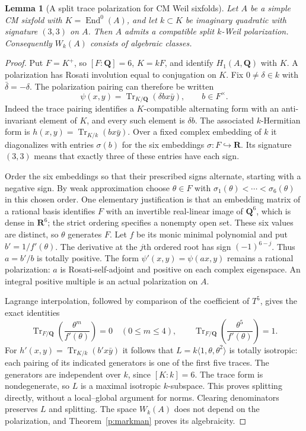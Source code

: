 \documentclass[10pt,reqno]{article}
\theoremstyle{emphasizedplain}
\theoremstyle{emphasizeddefinition}
\theoremstyle{emphasizeddefinition}
\newtheorem{prelemma}{Lemma}
\DeclareMathOperator{\End}{End}
\DeclareMathOperator{\Tr}{Tr}
\newcommand{\Q}{\mathbf Q}
\newcommand{\R}{\mathbf R}
\begin{document}
\begin{prelemma}[A split trace polarization for CM Weil sixfolds]
\label{p:CMsplit}
Let $A$ be a simple CM sixfold with $K=\End^0(A)$, and let
$k\subset K$ be imaginary quadratic with signature $(3,3)$ on $A$.
Then $A$ admits a compatible split $k$-Weil polarization. Consequently
$W_k(A)$ consists of algebraic classes.
\end{prelemma}
\begin{proof}
Put $F=K^+$, so $[F:\Q]=6$, $K=kF$, and identify $H_1(A,\Q)$
with $K$. A polarization has Rosati involution equal to conjugation on
$K$. Fix $0\ne\delta\in k$ with $\bar\delta=-\delta$.
The polarization pairing can therefore be written
\[
 \psi(x,y)=\Tr_{K/\Q}(\delta b x\bar y),\qquad b\in F^\times.
\]
Indeed the trace pairing identifies a $K$-compatible alternating form
with an anti-invariant element of $K$, and every such element is
$\delta b$. The associated $k$-Hermitian form is
$h(x,y)=\Tr_{K/k}(b x\bar y)$. Over a fixed complex embedding of $k$
it diagonalizes with entries $\sigma(b)$ for the six embeddings
$\sigma:F\hookrightarrow\R$. Its signature $(3,3)$ means that exactly
three of these entries have each sign.

Order the six embeddings so that their prescribed signs alternate,
starting with a negative sign. By weak approximation choose
$\theta\in F$ with
$\sigma_1(\theta)<\cdots<\sigma_6(\theta)$ in this chosen order.
One elementary justification is that an embedding matrix of a rational
basis identifies $F$ with an invertible real-linear image of $\Q^6$,
which is dense in $\R^6$; the strict ordering specifies a nonempty open
set. These six values are distinct, so $\theta$ generates $F$.
Let $f$ be its monic minimal polynomial and put $b'=1/f'(\theta)$.
The derivative at the $j$th ordered root has sign $(-1)^{6-j}$.
Thus $a=b'/b$ is totally positive. The form
$\psi'(x,y)=\psi(ax,y)$ remains a rational polarization: $a$ is
Rosati-self-adjoint and positive on each complex eigenspace. An
integral positive multiple is an actual polarization on $A$.

Lagrange interpolation, followed by comparison of the coefficient of
$T^5$, gives the exact identities
\[
 \Tr_{F/\Q}\!\left(\frac{\theta^m}{f'(\theta)}\right)=0
 \quad(0\le m\le4),\qquad
 \Tr_{F/\Q}\!\left(\frac{\theta^5}{f'(\theta)}\right)=1.
\]
For $h'(x,y)=\Tr_{K/k}(b'x\bar y)$ it follows that
$L=k\langle1,\theta,\theta^2\rangle$ is totally isotropic: each pairing
of its indicated generators is one of the first five traces.
The generators are independent over $k$, since $[K:k]=6$.
The trace form is nondegenerate, so $L$ is a maximal isotropic
$k$-subspace. This proves splitting directly, without a local--global
argument for norms. Clearing denominators preserves $L$ and splitting.
The space $W_k(A)$ does not depend on the polarization, and
Theorem~\ref{p:markman} proves its algebraicity.
\end{proof}
\end{document}
